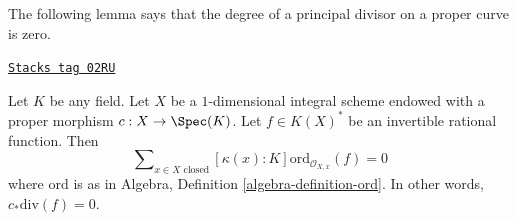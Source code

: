 The following lemma says that the degree of a principal divisor on
a proper curve is zero.

\begin{lemma}
\label{chow-lemma-curve-principal-divisor}
\href{https://stacks.math.columbia.edu/tag/02RU}{\texttt{Stacks tag 02RU}}

Let $K$ be any field. Let $X$ be a $1$-dimensional integral scheme
endowed with a proper morphism $c : X \to \Spec(K)$.
Let $f \in K(X)^*$ be an invertible rational function.
Then
$$
\sum\nolimits_{x \in X \text{ closed}}
[\kappa(x) : K] \text{ord}_{\mathcal{O}_{X, x}}(f)
=
0
$$
where $\text{ord}$ is as in
Algebra, Definition \ref{algebra-definition-ord}.
In other words, $c_*\text{div}(f) = 0$.
\end{lemma}

